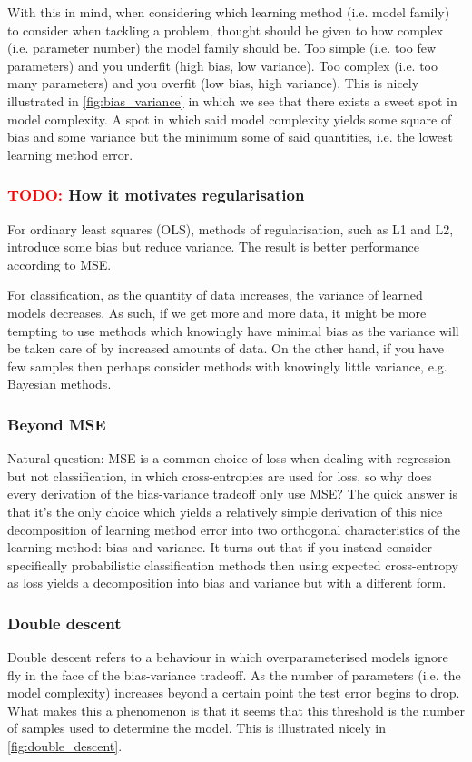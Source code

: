 \documentclass[11pt]{article}
\begin{document}
With this in mind, when considering which learning method (i.e. model family) to consider when tackling a problem, thought should be given to how complex (i.e. parameter number) the model family should be. Too simple (i.e. too few parameters) and you underfit (high bias, low variance). Too complex (i.e. too many parameters) and you overfit (low bias, high variance). This is nicely illustrated in \autoref{fig:bias_variance} in which we see that there exists a sweet spot in model complexity. A spot in which said model complexity yields some square of bias and some variance but the minimum some of said quantities, i.e. the lowest learning method error.

\subsubsection{\textcolor{red}{TODO:} How it motivates regularisation}
For ordinary least squares (OLS), methods of regularisation, such as L1 and L2, introduce some bias but reduce variance. The result is better performance according to MSE.

For classification, as the quantity of data increases, the variance of learned models decreases. As such, if we get more and more data, it might be more tempting to use methods which knowingly have minimal bias as the variance will be taken care of by increased amounts of data. On the other hand, if you have few samples then perhaps consider methods with knowingly little variance, e.g. Bayesian methods.

\subsubsection{Beyond MSE}
Natural question: MSE is a common choice of loss when dealing with regression but not classification, in which cross-entropies are used for loss, so why does every derivation of the bias-variance tradeoff only use MSE? The quick answer is that it's the only choice which yields a relatively simple derivation of this nice decomposition of learning method error into two orthogonal characteristics of the learning method: bias and variance. It turns out that if you instead consider specifically probabilistic classification methods then using expected cross-entropy as loss yields a decomposition into bias and variance but with a different form.

\subsubsection{Double descent}
Double descent refers to a behaviour in which overparameterised models ignore fly in the face of the bias-variance tradeoff. As the number of parameters (i.e. the model complexity) increases beyond a certain point the test error begins to drop. What makes this a phenomenon is that it seems that this threshold is the number of samples used to determine the model. This is illustrated nicely in \autoref{fig:double_descent}.
\end{document}
